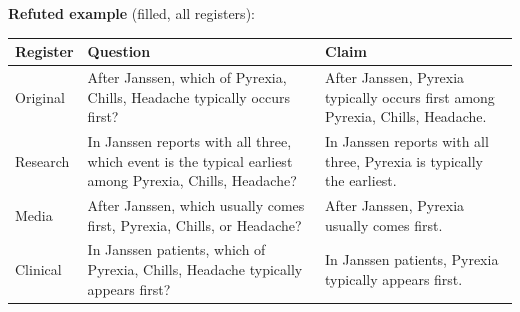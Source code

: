 \documentclass[11pt]{article}
\begin{document}
\vspace{3pt}
\textbf{Refuted example} (filled, all registers): \\
\begin{tabularx}{\linewidth}{@{}l L L@{}}
\toprule
\textbf{Register} & \textbf{Question} & \textbf{Claim} \\
\midrule
Original & After Janssen, which of Pyrexia, Chills, Headache typically occurs first? & After Janssen, Pyrexia typically occurs first among Pyrexia, Chills, Headache. \\
Research & In Janssen reports with all three, which event is the typical earliest among Pyrexia, Chills, Headache? & In Janssen reports with all three, Pyrexia is typically the earliest. \\
Media & After Janssen, which usually comes first, Pyrexia, Chills, or Headache? & After Janssen, Pyrexia usually comes first. \\
Clinical & In Janssen patients, which of Pyrexia, Chills, Headache typically appears first? & In Janssen patients, Pyrexia typically appears first. \\
\bottomrule
\end{tabularx}
\vspace{3pt}
\end{document}
